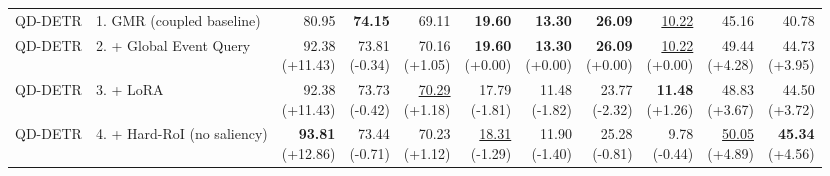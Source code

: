 \documentclass{article}
\begin{document}
{\begin{tabular}{llrrrrrrrrr}
\midrule
QD-DETR & 1. GMR (coupled baseline) & 80.95 & \textbf{74.15} & 69.11 & \textbf{19.60} & \textbf{13.30} & \textbf{26.09} & \underline{10.22} & 45.16 & 40.78 \\
QD-DETR & 2. + Global Event Query & \shortstack{92.38 \\ {\scriptsize (+11.43)}} & \shortstack{73.81 \\ {\scriptsize (-0.34)}} & \shortstack{70.16 \\ {\scriptsize (+1.05)}} & \shortstack{\textbf{19.60} \\ {\scriptsize (+0.00)}} & \shortstack{\textbf{13.30} \\ {\scriptsize (+0.00)}} & \shortstack{\textbf{26.09} \\ {\scriptsize (+0.00)}} & \shortstack{\underline{10.22} \\ {\scriptsize (+0.00)}} & \shortstack{49.44 \\ {\scriptsize (+4.28)}} & \shortstack{44.73 \\ {\scriptsize (+3.95)}} \\
QD-DETR & 3. + LoRA & \shortstack{92.38 \\ {\scriptsize (+11.43)}} & \shortstack{73.73 \\ {\scriptsize (-0.42)}} & \shortstack{\underline{70.29} \\ {\scriptsize (+1.18)}} & \shortstack{17.79 \\ {\scriptsize (-1.81)}} & \shortstack{11.48 \\ {\scriptsize (-1.82)}} & \shortstack{23.77 \\ {\scriptsize (-2.32)}} & \shortstack{\textbf{11.48} \\ {\scriptsize (+1.26)}} & \shortstack{48.83 \\ {\scriptsize (+3.67)}} & \shortstack{44.50 \\ {\scriptsize (+3.72)}} \\
QD-DETR & 4. + Hard-RoI (no saliency) & \shortstack{\textbf{93.81} \\ {\scriptsize (+12.86)}} & \shortstack{73.44 \\ {\scriptsize (-0.71)}} & \shortstack{70.23 \\ {\scriptsize (+1.12)}} & \shortstack{\underline{18.31} \\ {\scriptsize (-1.29)}} & \shortstack{11.90 \\ {\scriptsize (-1.40)}} & \shortstack{25.28 \\ {\scriptsize (-0.81)}} & \shortstack{9.78 \\ {\scriptsize (-0.44)}} & \shortstack{\underline{50.05} \\ {\scriptsize (+4.89)}} & \shortstack{\textbf{45.34} \\ {\scriptsize (+4.56)}} \\

\end{tabular}}
\end{document}
